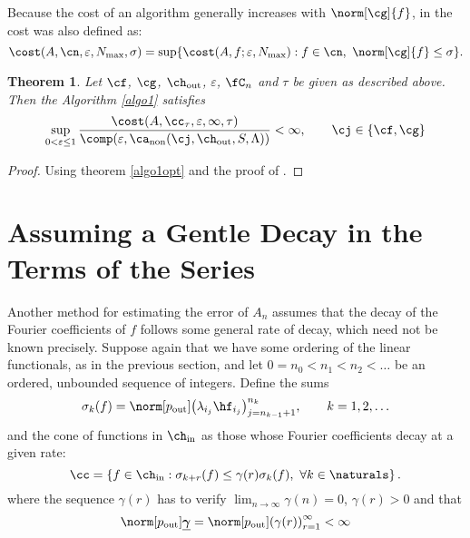 \documentclass[final]{elsarticle}
\newcommand{\chin}{\ch_{\text{\rm{in}}}}
\newcommand{\chout}{\ch_{\text{\rm{out}}}}
\newcommand{\pout}{p_{\text{\rm{out}}}}
\newcommand{\bgamma}{\underline{\boldsymbol\gamma}}
\DeclareMathOperator{\non}{non}
\newtheorem{theorem}{Theorem}
\theoremstyle{definition}
\theoremstyle{remark}
\begin{document}
Because the cost of an algorithm generally increases with $\norm[\cg]{f}$, in \cite{HicEtal14b} the cost was also defined as:
\begin{equation*}
\cost(A,\cn,\varepsilon,N_{\max},\sigma)
= \sup \{ \cost(A,f;\varepsilon,N_{\max}) : f \in \cn, \ \norm[\cg]{f} \le \sigma \} .
\end{equation*}

\begin{theorem}
Let $\cf$, $\cg$, $\chout$, $\varepsilon$, $\fC_n$ and $\tau$ be given as described above. Then the Algorithm \ref{algo1} satisfies
\begin{equation*}
\sup_{0 < \varepsilon \le 1}\frac{\cost(A,\cc_\tau,\varepsilon,\infty,\tau)} {\comp(\varepsilon,\ca_{\non}(\cj,\chout,S,\Lambda))} <\infty, \qquad \cj \in \{\cf,\cg\}
\end{equation*}
\end{theorem}
\begin{proof}
Using theorem \ref{algo1opt} and the proof of \cite{HicEtal14b}.
\end{proof}

\section{Assuming a Gentle Decay in the Terms of the Series}

Another method for estimating the error of $A_n$ assumes that the decay of the Fourier coefficients of $f$ follows some general rate of decay, which need not be known precisely.  Suppose again that we have some ordering of the linear functionals, as in the previous section, and let $0=n_0 < n_1 < n_2 < \ldots$ be an ordered, unbounded sequence of integers.  Define the sums
\begin{equation} \label{sumdef}
\sigma_k(f) = \norm[\pout]{ \left(\lambda_{i_j} \hf_{i_j} \right)_{j=n_{k-1}+1}^{n_k}}, \qquad k=1, 2, \ldots
\end{equation}
and the cone of functions in $\chin$ as those whose Fourier coefficients decay at a given rate:
\begin{equation} \label{decayconedef}
\cc = \left\{ f \in \chin : \sigma_{k+r}(f) \le \gamma(r) \sigma_k (f), \ \forall k \in \naturals \right\}.
\end{equation}
where the sequence $\gamma(r)$ has to verify $\lim_{n\rightarrow\infty}\gamma(n)=0$, $\gamma(r) > 0$ and that
\begin{equation} \label{constcone}
\norm[\pout]{\bgamma}=\norm[\pout]{ \left(\gamma(r)\right)_{r=1}^\infty}<\infty
\end{equation}
\end{document}

